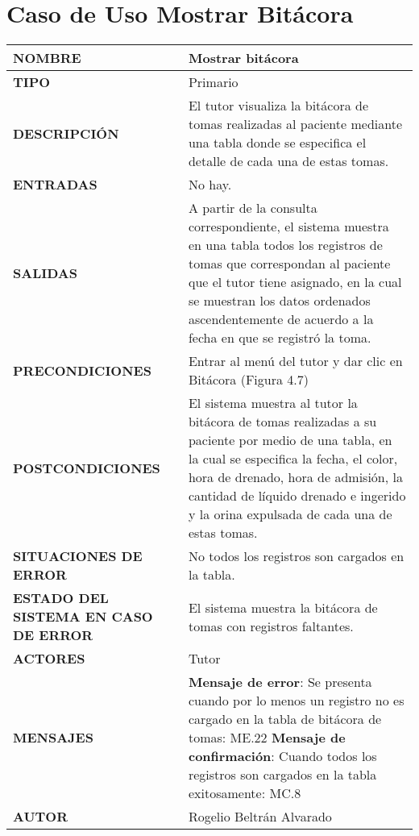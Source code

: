 \newpage
\section{Caso de Uso Mostrar Bitácora}
\begin{longtable}{ | p{6cm} | p{10cm} |}
\hline
      \textbf{NOMBRE} & Mostrar bitácora\\
      \hline
      \textbf{TIPO} & Primario\\
      \hline
      \textbf{DESCRIPCIÓN} & El tutor visualiza la bitácora de tomas realizadas al paciente mediante una tabla donde se especifica el detalle de cada una de estas tomas.\\
      \hline
      \textbf{ENTRADAS} & No hay.\\
      \hline
      \textbf{SALIDAS} & A partir de la consulta correspondiente, el sistema muestra en una tabla todos los registros de tomas que correspondan al paciente que el tutor tiene asignado, en la cual se muestran los datos ordenados ascendentemente de acuerdo a la fecha en que se registró la toma.\\
      \hline
      \textbf{PRECONDICIONES} & Entrar al menú del tutor y dar clic en Bitácora (Figura 4.7)\\
      \hline
      \textbf{POSTCONDICIONES} & El sistema muestra al tutor la bitácora de tomas realizadas a su paciente por medio de una tabla, en la cual se especifica la fecha, el color, hora de drenado, hora de admisión, la cantidad de líquido drenado e ingerido y la orina expulsada de cada una de estas tomas.\\
      \hline
      \textbf{SITUACIONES DE ERROR} & No todos los registros son cargados en la tabla. \\
      \hline
      \textbf{ESTADO DEL SISTEMA EN CASO DE ERROR} &  El sistema muestra la bitácora de tomas con registros faltantes.\\
      \hline
      \textbf{ACTORES} & Tutor\\
      \hline
      \textbf{MENSAJES} & \textbf{Mensaje de error}: Se presenta cuando por lo menos un registro no es cargado en la tabla de bitácora de tomas: ME.22
      \newline \textbf{Mensaje de confirmación}: Cuando todos los registros son cargados en la tabla exitosamente: MC.8\\
      \hline
      \textbf{AUTOR} & Rogelio Beltrán Alvarado \\
	  \hline
\end{longtable}
\vspace*{1cm}

